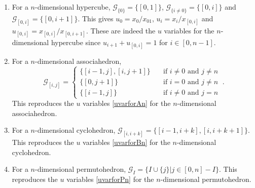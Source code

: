 \documentclass[hidelinks,12pt]{article}
\begin{document}
\begin{enumerate}[label=(\roman*)]
   \item For a $n$-dimensional hypercube, $\mathscr{G}_{\{0\}}=\{[0,1]\}$, $\mathscr{G}_{\{i\neq 0\}}=\{[0,i]\}$ and $\mathscr{G}_{[0,i]}=\{[0,i+1]\}$. This gives $u_{0}=x_{0}/x_{01}$, $u_{i}=x_{i}/x_{[0,i]}$ and $u_{[0,i]}=x_{[0,i]}/x_{[0,i+1]}$. These are indeed the $u$ variables for the $n$-dimensional hypercube since  $u_{i+1}+u_{[0,i]}=1$ for $i\in [0,n{-}1]$.
   \item For a $n$-dimensional associahedron,
   \[
   \mathscr{G}_{[i,j]}=\begin{cases}
      \{[i-1,j],[i,j+1]\}   & \quad \text{if $i\neq 0$ and $j\neq n $}\\
      \{[0,j+1]\} &\quad \text{if $i= 0$ and $j\neq n $} \\
      \{[i-1,j]\} &\quad \text{if $i\neq 0$ and $j= n $}
   \end{cases}   \:.
   \]
   This reproduces the $u$ variables \eqref{uvarforAn} for the $n$-dimensional associahedron.
   \item For a $n$-dimensional cyclohedron, $\mathscr{G}_{[i,i+k]}=\{[i-1,i+k],[i,i+k+1]\}$.  This reproduces the $u$ variables \eqref{uvarforBn} for the $n$-dimensional cyclohedron.
   \item For a $n$-dimensional permutohedron, $\mathscr{G}_{I}=\{I\cup\{j\}\vert j\in [0,n]-I \}$. This reproduces the $u$ variables \eqref{uvarforPn} for the $n$-dimensional permutohedron.
\end{enumerate}

\end{document}
